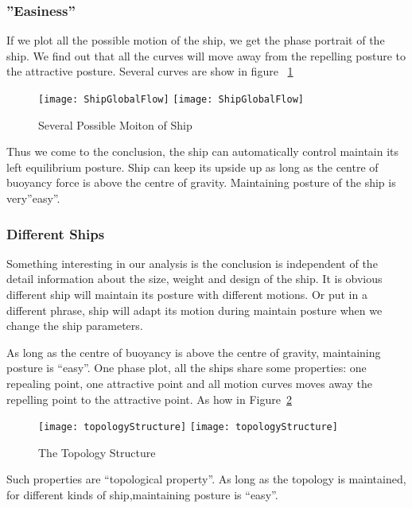 \subsubsection*{''Easiness''}
If we plot all the possible motion of the ship, we get the phase portrait of the ship. 
We find out that all the curves will move away from the repelling posture to the attractive posture.
 Several curves are show in figure ~\ref{fig:globalflow}
\begin{figure}[!htbp]
  \begin{center}
    \leavevmode
    \ifpdf
      \texttt{[image: ShipGlobalFlow]}
    \else
      \texttt{[image: ShipGlobalFlow]}
    \fi
    \caption{Several Possible Moiton of Ship}
    \label{fig:globalflow}
  \end{center}
\end{figure}

Thus we come to the conclusion, the ship can automatically control maintain its left equilibrium posture. 
Ship can keep its upside up as long as the centre of buoyancy force is above the centre of gravity.
Maintaining posture of the ship is very”easy”.


\subsubsection*{Different Ships} 
Something interesting in our analysis is the conclusion is independent of the detail information about the size, weight and design of the ship. 
It is obvious different ship will maintain its posture with different motions. 
Or put in a different phrase, ship will adapt its motion during maintain posture when we change the ship  parameters.

As long as the centre of buoyancy is above the centre of gravity, maintaining posture is “easy”.
One phase plot, all the ships share some properties: one repealing point, one attractive point and all motion curves moves away the repelling point to the attractive point. As how in Figure~\ref{fig:topologyStructure}

\begin{figure}[!htbp]
  \begin{center}
    \leavevmode
    \ifpdf
      \texttt{[image: topologyStructure]}
    \else
      \texttt{[image: topologyStructure]}
    \fi
    \caption{The Topology Structure}
    \label{fig:topologyStructure}
  \end{center}
\end{figure}


Such properties are “topological property”.
As long as the topology is maintained, for different kinds of ship,maintaining posture is “easy”.


